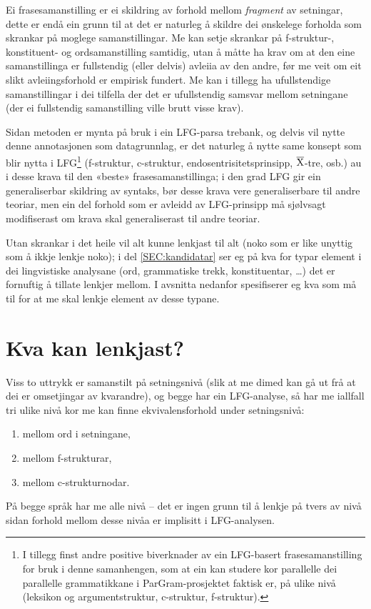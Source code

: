 \documentclass[12pt,a4paper,oneside,draft]{report}
\newcommand{\xbar}{$\rm\overline{X}$}
\begin{document}
Ei frasesamanstilling er ei skildring av forhold mellom \emph{fragment} av
setningar, dette er endå ein grunn til at det er naturleg å skildre
dei ønskelege forholda som skrankar på moglege samanstillingar. Me kan
setje skrankar på f-struktur-, konstituent- og ordsamanstilling
samtidig, utan å måtte ha krav om at den eine samanstillinga er
fullstendig (eller delvis) avleiia av den andre, før me veit om eit
slikt avleiingsforhold er empirisk fundert. Me kan i tillegg ha
ufullstendige samanstillingar i dei tilfella der det er ufullstendig
samsvar mellom setningane (der ei fullstendig samanstilling ville
brutt visse krav).

Sidan metoden er mynta på bruk i ein LFG-parsa trebank, og delvis vil
nytte denne annotasjonen som datagrunnlag, er det naturleg å nytte
same konsept som blir nytta i LFG\footnote{I tillegg finst andre positive biverknader av ein LFG-basert
       frasesamanstilling for bruk i denne samanhengen, som at ein kan
       studere kor parallelle dei parallelle grammatikkane i
       ParGram-prosjektet \citep{butt2002pgp} faktisk er, på ulike
       nivå (leksikon og argumentstruktur, c-struktur, f-struktur). } (f-struktur, c-struktur,
endosentrisitetsprinsipp, \xbar{}-tre, osb.)  au i desse krava til den
«beste» frasesamanstillinga; i den grad LFG gir ein generaliserbar
skildring av syntaks, bør desse krava vere generaliserbare til andre
teoriar, men ein del forhold som er avleidd av LFG-prinsipp må
sjølvsagt modifiserast om krava skal generaliserast til andre teoriar.

Utan skrankar i det heile vil alt kunne lenkjast til alt (noko som er
like unyttig som å ikkje lenkje noko); i del \ref{SEC:kandidatar} ser
eg på kva for typar element i dei lingvistiske analysane (ord,
grammatiske trekk, konstituentar, \ldots{}) det er fornuftig å tillate
lenkjer mellom. I avsnitta nedanfor spesifiserer eg kva som må til for
at me skal lenkje element av desse typane.

\section{Kva kan lenkjast?}
\label{sec-3.4}

\label{SEC:kandidatar}

Viss to uttrykk er samanstilt på setningsnivå (slik at me dimed kan gå
ut frå at dei er omsetjingar av kvarandre), og begge har ein
LFG-analyse, så har me iallfall tri ulike nivå kor me kan finne
ekvivalensforhold under setningsnivå:
\begin{enumerate}
\item mellom ord i setningane,
\item mellom f-strukturar,
\item mellom c-strukturnodar.
\end{enumerate}
På begge språk har me alle nivå -- det er ingen grunn til å lenkje på
tvers av nivå sidan forhold mellom desse nivåa er implisitt i
LFG-analysen.
\end{document}
